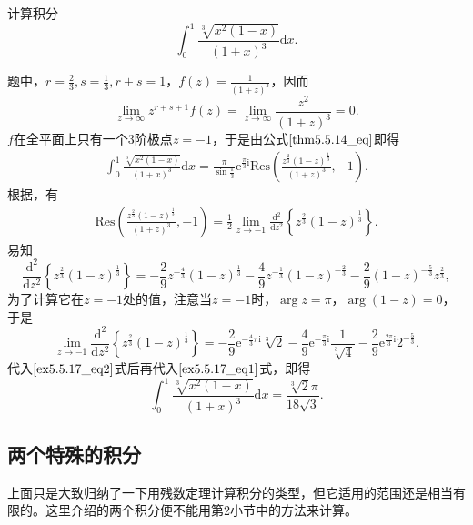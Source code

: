\documentclass[../../main.tex]{subfiles}
\begin{document}
\begin{example}
计算积分
\[
\int_{0}^{1} \frac{\sqrt[3]{x^2 (1 - x)}}{(1 + x)^3} \mathrm{d}x.
\]
\end{example}
\begin{solution}
题中，\( r = \frac{2}{3}, s = \frac{1}{3}, r + s = 1 \)，\( f(z) = \frac{1}{(1 + z)^3} \)，因而
\[
\lim_{z \to \infty} z^{r + s + 1} f(z) = \lim_{z \to \infty} \frac{z^2}{(1 + z)^3} = 0.
\]
\( f \)在全平面上只有一个3阶极点\( z = -1 \)，于是由公式\(\eqref{thm5.5.14_eq}\)即得
\begin{align}
\int_{0}^{1} \frac{\sqrt[3]{x^2 (1 - x)}}{(1 + x)^3} \mathrm{d}x = \frac{\pi}{\sin \frac{\pi}{3}} \mathrm{e}^{\frac{\pi}{3} \mathrm{i}} \mathrm{Res}\left( \frac{z^{\frac{2}{3}} (1 - z)^{\frac{1}{3}}}{(1 + z)^3}, -1 \right). \label{ex5.5.17_eq1}
\end{align}
根据，有
\begin{align}
\mathrm{Res}\left( \frac{z^{\frac{2}{3}} (1 - z)^{\frac{1}{3}}}{(1 + z)^3}, -1 \right) = \frac{1}{2} \lim_{z \to -1} \frac{\mathrm{d}^2}{\mathrm{d}z^2} \left\{ z^{\frac{2}{3}} (1 - z)^{\frac{1}{3}} \right\}. \label{ex5.5.17_eq2}
\end{align}
易知
\[
\frac{\mathrm{d}^2}{\mathrm{d}z^2} \left\{ z^{\frac{2}{3}} (1 - z)^{\frac{1}{3}} \right\} = -\frac{2}{9} z^{-\frac{4}{3}} (1 - z)^{\frac{1}{3}} - \frac{4}{9} z^{-\frac{1}{3}} (1 - z)^{-\frac{2}{3}}
- \frac{2}{9} (1 - z)^{-\frac{5}{3}} z^{\frac{2}{3}},
\]
为了计算它在\( z = -1 \)处的值，注意当\( z = -1 \)时，\(\arg z = \pi\)，\(\arg(1 - z) = 0\)，于是
\[
\lim_{z \to -1} \frac{\mathrm{d}^2}{\mathrm{d}z^2} \left\{ z^{\frac{2}{3}} (1 - z)^{\frac{1}{3}} \right\} = -\frac{2}{9} \mathrm{e}^{-\frac{4}{3} \pi \mathrm{i}} \sqrt[3]{2} - \frac{4}{9} \mathrm{e}^{-\frac{\pi}{3} \mathrm{i}} \frac{1}{\sqrt[3]{4}}
- \frac{2}{9} \mathrm{e}^{\frac{2\pi}{3} \mathrm{i}} 2^{-\frac{5}{3}}.
\]
代入\(\eqref{ex5.5.17_eq2}\)式后再代入\(\eqref{ex5.5.17_eq1}\)式，即得
\[
\int_{0}^{1} \frac{\sqrt[3]{x^2 (1 - x)}}{(1 + x)^3} \mathrm{d}x = \frac{\sqrt[3]{2} \pi}{18 \sqrt{3}}.
\]
\end{solution}


\subsection{两个特殊的积分}

上面只是大致归纳了一下用残数定理计算积分的类型，但它适用的范围还是相当有限的。这里介绍的两个积分便不能用第2小节中的方法来计算。
\end{document}
